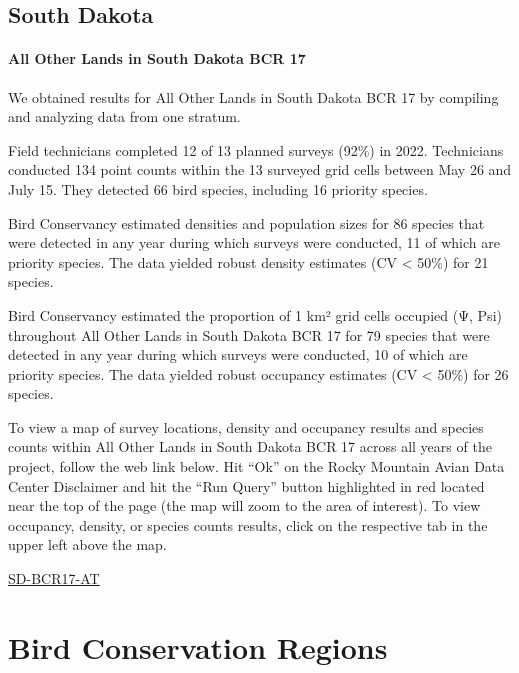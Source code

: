 \documentclass[
  letterpaper,
  DIV=11,
  numbers=noendperiod,
  oneside]{scrreprt}
\begin{document}
\hypertarget{south-dakota}{%
\section{South Dakota}\label{south-dakota}}

\hypertarget{all-other-lands-in-south-dakota-bcr-17}{%
\subsubsection{All Other Lands in South Dakota BCR
17}\label{all-other-lands-in-south-dakota-bcr-17}}

We obtained results for All Other Lands in South Dakota BCR 17 by
compiling and analyzing data from one stratum.

Field technicians completed 12 of 13 planned surveys (92\%) in 2022.
Technicians conducted 134 point counts within the 13 surveyed grid cells
between May 26 and July 15. They detected 66 bird species, including 16
priority species.

Bird Conservancy estimated densities and population sizes for 86 species
that were detected in any year during which surveys were conducted, 11
of which are priority species. The data yielded robust density estimates
(CV \textless{} 50\%) for 21 species.

Bird Conservancy estimated the proportion of 1 km² grid cells occupied
(Ψ, Psi) throughout All Other Lands in South Dakota BCR 17 for 79
species that were detected in any year during which surveys were
conducted, 10 of which are priority species. The data yielded robust
occupancy estimates (CV \textless{} 50\%) for 26 species.

To view a map of survey locations, density and occupancy results and
species counts within All Other Lands in South Dakota BCR 17 across all
years of the project, follow the web link below. Hit ``Ok'' on the Rocky
Mountain Avian Data Center Disclaimer and hit the ``Run Query'' button
highlighted in red located near the top of the page (the map will zoom
to the area of interest). To view occupancy, density, or species counts
results, click on the respective tab in the upper left above the map.

\href{http://www.rmbo.org/new_site/adc/QueryWindow.aspx\#N4IgzgLgTghhCuBbEAuABCAygEQLQCEBhAJQEYB2XAQQBV0qAbBtAeQgAsBTKNAGRgB2AEzAgAvkA===}{SD-BCR17-AT}

\hypertarget{bird-conservation-regions}{%
\chapter{Bird Conservation Regions}\label{bird-conservation-regions}}
\end{document}
